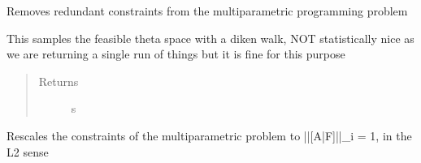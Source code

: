 \documentclass[letterpaper,10pt,english]{sphinxmanual}
\begin{document}
\begin{fulllineitems}
\begin{fulllineitems}
\end{fulllineitems}


\begin{fulllineitems}
\label{\detokenize{ppopt:ppopt.mplp_program.MPLP_Program.process_constraints}}
\sphinxAtStartPar
Removes redundant constraints from the multiparametric programming problem

\end{fulllineitems}


\begin{fulllineitems}
\label{\detokenize{ppopt:ppopt.mplp_program.MPLP_Program.sample_theta_space}}
\sphinxAtStartPar
This samples the feasible theta space with a diken walk, NOT statistically nice as we are returning a single run of things but it is fine for this purpose
\begin{quote}\begin{description}
\item[{Returns}] \leavevmode
\sphinxAtStartPar
s

\end{description}\end{quote}

\end{fulllineitems}


\begin{fulllineitems}
\label{\detokenize{ppopt:ppopt.mplp_program.MPLP_Program.scale_constraints}}
\sphinxAtStartPar
Rescales the constraints of the multiparametric problem to ||{[}A|\sphinxhyphen{}F{]}||\_i = 1, in the L2 sense


\end{fulllineitems}
\end{fulllineitems}
\end{document}
